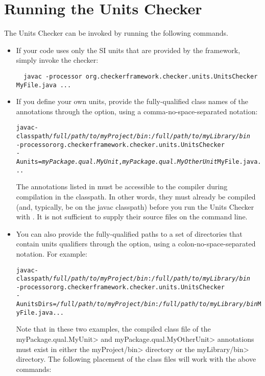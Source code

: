 \section{Running the Units Checker\label{units-running}}

The Units Checker can be invoked by running the following commands.

\begin{itemize}
\item
If your code uses only the SI units that are provided by the
framework, simply invoke the checker:

\begin{Verbatim}
  javac -processor org.checkerframework.checker.units.UnitsChecker MyFile.java ...
\end{Verbatim}

\item
If you define your own units, provide the fully-qualified class names of the
annotations through the  option, using a comma-no-space-separated
notation:

\begin{alltt}
  javac -classpath \textit{/full/path/to/myProject/bin}:\textit{/full/path/to/myLibrary/bin} \ttbs
        -processor org.checkerframework.checker.units.UnitsChecker \ttbs
        -Aunits=\textit{myPackage.qual.MyUnit},\textit{myPackage.qual.MyOtherUnit} MyFile.java ...
\end{alltt}

The annotations listed in  must be accessible to
the compiler during compilation in the classpath.  In other words, they must
already be compiled (and, typically, be on the javac classpath)
before you run the Units Checker with .  It
is not sufficient to supply their source files on the command line.

\item
You can also provide the fully-qualified paths to a set of directories
that contain units qualifiers through the  option,
using a colon-no-space-separated notation. For example:

\begin{alltt}
  javac -classpath \textit{/full/path/to/myProject/bin}:\textit{/full/path/to/myLibrary/bin} \ttbs
        -processor org.checkerframework.checker.units.UnitsChecker \ttbs
        -AunitsDirs=\textit{/full/path/to/myProject/bin}:\textit{/full/path/to/myLibrary/bin} MyFile.java ...
\end{alltt}

Note that in these two examples, the compiled class file of the
\<myPackage.qual.MyUnit> and \<myPackage.qual.MyOtherUnit> annotations
must exist in either the \<myProject/bin> directory or the
\<myLibrary/bin> directory. The following placement of the class files
will work with the above commands:


\end{itemize}
